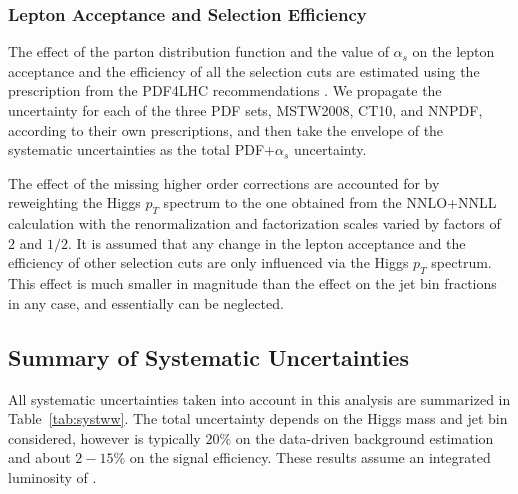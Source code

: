 \subsubsection{Lepton Acceptance and Selection Efficiency }

The effect of the parton distribution function and the value of $\alpha_{s}$
 on the lepton acceptance and the efficiency of all the selection cuts are 
estimated using the prescription from the PDF4LHC recommendations \cite{PDF4LHC}. We 
propagate the uncertainty for each of the three PDF sets, MSTW2008, CT10, and
NNPDF, according to their own prescriptions, and then take the envelope
of the systematic uncertainties as the total PDF+$\alpha_{s}$  uncertainty. 

The effect of the missing higher order corrections are accounted for by
reweighting the Higgs $p_{T}$ spectrum to the one obtained from the
NNLO+NNLL calculation with the renormalization and factorization scales
varied by factors of $2$ and $1/2$. It is assumed that any change in the
lepton acceptance and the efficiency of other selection cuts are only
influenced via the Higgs $p_{T}$ spectrum. This effect is much smaller in 
magnitude than the effect on the jet bin fractions in any case, and 
essentially can be neglected.



\subsection{Summary of Systematic Uncertainties}
All systematic uncertainties taken into account in this analysis
are summarized in Table~\ref{tab:systww}.
The total uncertainty depends on the Higgs mass and jet bin considered,
however is typically $20\%$ on the data-driven background estimation and about $2-15\%$ 
on the signal efficiency. These results assume an integrated luminosity of \intlumi.

